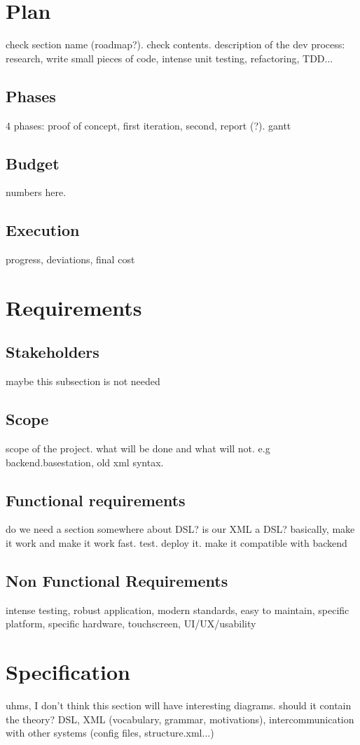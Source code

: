 \chapter{Plan}
check section name (roadmap?). check contents.
description of the dev process: research, write small pieces of code, intense unit testing, refactoring, TDD...

\section{Phases}
4 phases: proof of concept, first iteration, second, report (?). gantt
\section{Budget}
numbers here.
\section{Execution}
progress, deviations, final cost


\chapter{Requirements}
\section{Stakeholders}
maybe this subsection is not needed
\section{Scope}
scope of the project. what will be done and what will not. e.g backend.basestation, old xml syntax.

\section{Functional requirements}
do we need a section somewhere about DSL? is our XML a DSL?
basically, make it work and make it work fast. test. deploy it. make it compatible with backend

\section{Non Functional Requirements}
intense testing, robust application, modern standards, easy to maintain, specific platform, specific hardware, touchscreen, UI/UX/usability

\chapter{Specification}
uhms, I don't think this section will have interesting diagrams.
should it contain the theory? DSL, XML (vocabulary, grammar, motivations), intercommunication with other systems (config files, structure.xml...)

